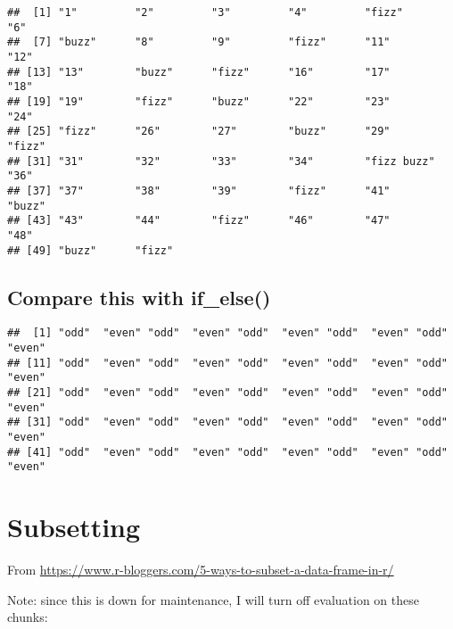 \documentclass[]{book}
\newenvironment{Shaded}{\begin{snugshade}}{\end{snugshade}}
\newcommand{\DecValTok}[1]{\textcolor[rgb]{0.00,0.00,0.81}{#1}}
\newcommand{\KeywordTok}[1]{\textcolor[rgb]{0.13,0.29,0.53}{\textbf{#1}}}
\newcommand{\NormalTok}[1]{#1}
\newcommand{\OperatorTok}[1]{\textcolor[rgb]{0.81,0.36,0.00}{\textbf{#1}}}
\newcommand{\StringTok}[1]{\textcolor[rgb]{0.31,0.60,0.02}{#1}}
\begin{document}
\begin{verbatim}
##  [1] "1"         "2"         "3"         "4"         "fizz"      "6"        
##  [7] "buzz"      "8"         "9"         "fizz"      "11"        "12"       
## [13] "13"        "buzz"      "fizz"      "16"        "17"        "18"       
## [19] "19"        "fizz"      "buzz"      "22"        "23"        "24"       
## [25] "fizz"      "26"        "27"        "buzz"      "29"        "fizz"     
## [31] "31"        "32"        "33"        "34"        "fizz buzz" "36"       
## [37] "37"        "38"        "39"        "fizz"      "41"        "buzz"     
## [43] "43"        "44"        "fizz"      "46"        "47"        "48"       
## [49] "buzz"      "fizz"
\end{verbatim}

\hypertarget{compare-this-with-if_else}{%
\section{Compare this with if\_else()}\label{compare-this-with-if_else}}

\begin{Shaded}
\end{Shaded}

\begin{verbatim}
##  [1] "odd"  "even" "odd"  "even" "odd"  "even" "odd"  "even" "odd"  "even"
## [11] "odd"  "even" "odd"  "even" "odd"  "even" "odd"  "even" "odd"  "even"
## [21] "odd"  "even" "odd"  "even" "odd"  "even" "odd"  "even" "odd"  "even"
## [31] "odd"  "even" "odd"  "even" "odd"  "even" "odd"  "even" "odd"  "even"
## [41] "odd"  "even" "odd"  "even" "odd"  "even" "odd"  "even" "odd"  "even"
\end{verbatim}

\hypertarget{subset}{%
\chapter{Subsetting}\label{subset}}

From \url{https://www.r-bloggers.com/5-ways-to-subset-a-data-frame-in-r/}

Note: since this is down for maintenance, I will turn off evaluation on these chunks:
\end{document}
